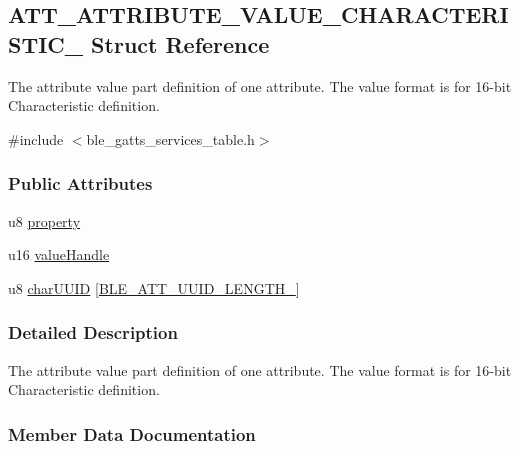 \hypertarget{struct_a_t_t___a_t_t_r_i_b_u_t_e___v_a_l_u_e___c_h_a_r_a_c_t_e_r_i_s_t_i_c__2}{}\subsection{A\+T\+T\+\_\+\+A\+T\+T\+R\+I\+B\+U\+T\+E\+\_\+\+V\+A\+L\+U\+E\+\_\+\+C\+H\+A\+R\+A\+C\+T\+E\+R\+I\+S\+T\+I\+C\+\_ Struct Reference}
\label{struct_a_t_t___a_t_t_r_i_b_u_t_e___v_a_l_u_e___c_h_a_r_a_c_t_e_r_i_s_t_i_c__2}


The attribute value part definition of one attribute. The value format is for 16-\/bit Characteristic definition.  




{\ttfamily \#include $<$ble\+\_\+gatts\+\_\+services\+\_\+table.\+h$>$}

\subsubsection*{Public Attributes}
\begin{DoxyCompactItemize}
\item 
u8 \hyperlink{struct_a_t_t___a_t_t_r_i_b_u_t_e___v_a_l_u_e___c_h_a_r_a_c_t_e_r_i_s_t_i_c__2_a5b32f3cb40b6419a1b307a90edb96a07}{property}
\item 
u16 \hyperlink{struct_a_t_t___a_t_t_r_i_b_u_t_e___v_a_l_u_e___c_h_a_r_a_c_t_e_r_i_s_t_i_c__2_a6c265249ac8027ce234d0de418211c5d}{value\+Handle}
\item 
u8 \hyperlink{struct_a_t_t___a_t_t_r_i_b_u_t_e___v_a_l_u_e___c_h_a_r_a_c_t_e_r_i_s_t_i_c__2_a15a1c5f7583a3d25efd3c23dcee4b0bf}{char\+U\+U\+ID} \mbox{[}\hyperlink{group___b_l_e___a_t_t___u_u_i_d___l_e_n_g_t_h___t_y_p_e_s_gad9197bbabd94416a4a41891fb808dcf1}{B\+L\+E\+\_\+\+A\+T\+T\+\_\+\+U\+U\+I\+D\+\_\+\+L\+E\+N\+G\+T\+H\+\_}\mbox{]}
\end{DoxyCompactItemize}


\subsubsection{Detailed Description}
The attribute value part definition of one attribute. The value format is for 16-\/bit Characteristic definition. 

\subsubsection{Member Data Documentation}
